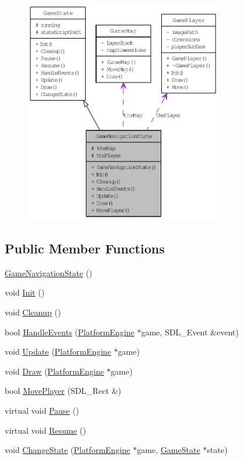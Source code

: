 \begin{figure}[H]
\begin{center}
\leavevmode
\includegraphics[width=244pt]{d1/d57/class_game_navigation_state__coll__graph}
\end{center}
\end{figure}
\subsection*{Public Member Functions}
\begin{CompactItemize}
\item 
\hyperlink{class_game_navigation_state_6a3b93831c85eb5dc3de0a53ca13ddfc}{GameNavigationState} ()
\item 
void \hyperlink{class_game_navigation_state_8f613860bf544476ab9cff9fb7f98201}{Init} ()
\item 
void \hyperlink{class_game_navigation_state_f93a7dbb7eac4b14a6d59cbca32b9abd}{Cleanup} ()
\item 
bool \hyperlink{class_game_navigation_state_6e7c13d35a33478673c62ae55394cfdc}{HandleEvents} (\hyperlink{class_platform_engine}{PlatformEngine} $\ast$game, SDL\_\-Event \&event)
\item 
void \hyperlink{class_game_navigation_state_90f5e6d6287a875d8f2737180f46a004}{Update} (\hyperlink{class_platform_engine}{PlatformEngine} $\ast$game)
\item 
void \hyperlink{class_game_navigation_state_a37dce070a906454c512192c067fda09}{Draw} (\hyperlink{class_platform_engine}{PlatformEngine} $\ast$game)
\item 
bool \hyperlink{class_game_navigation_state_23f15bb01ff8d7d304949c5b336d59f2}{MovePlayer} (SDL\_\-Rect \&)
\item 
virtual void \hyperlink{class_game_state_0c47c6969a4e0bb32d6cdf7bf9376817}{Pause} ()
\item 
virtual void \hyperlink{class_game_state_d12ece3c3fb066281b73b07a315f04e8}{Resume} ()
\item 
void \hyperlink{class_game_state_f786aeb704a22a135dc289bb89fcc452}{ChangeState} (\hyperlink{class_platform_engine}{PlatformEngine} $\ast$game, \hyperlink{class_game_state}{GameState} $\ast$state)
\end{CompactItemize}
